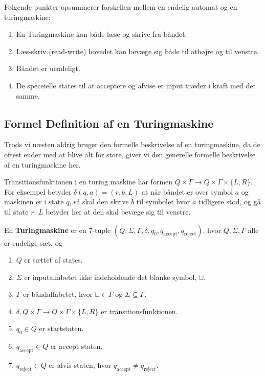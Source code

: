 Følgende punkter opsummerer forskellen mellem en endelig automat og en turingmaskine:

\begin{enumerate}
	\item En Turingmaskine kan både læse og skrive fra båndet.
	\item Læs-skriv (read-write) hovedet kan bevæge sig både til athøjre og til venstre.
	\item Båndet er uendeligt.
	\item De speceielle states til at acceptere og afvise et input træder i kraft med det samme.
\end{enumerate}



\subsection{Formel Definition af en Turingmaskine}%
\label{subsec:formaldefturingmachine}



Trods vi næsten aldrig bruger den formelle beskrivelse af en turingmaskine, da de oftest ender med at blive alt for store, giver vi den generelle formelle beskrivelse af en turingmaskine her.

Transitionsfunktionen i en turing maskine har formen $Q \times \Gamma \longrightarrow Q \times \Gamma \times \{L, R\}$. For eksempel betyder $\delta (q,a) = (r,b,L)$ at når båndet er over symbol $a$ og maskinen er i state $q$, så skal den skrive $b$ til symbolet hvor $a$ tidligere stod, og gå til state $r$. $L$ betyder her at den skal bevæge sig til venstre.

\begin{definition}
	\label{def:formalturing}
	En \textbf{Turingmaskine} er en 7-tuple $(Q, \Sigma, \Gamma, \delta, q_{0}, q_{\text{accept}}, q_{\text{reject}})$, hvor $Q, \Sigma, \Gamma$ alle er endelige sæt, og
	\begin{enumerate}
		\item $Q$ er sættet af states.
		\item $\Sigma$ er inputalfabetet ikke indeholdende det blanke symbol, $\sqcup$.
		\item $\Gamma$ er båndalfabetet, hvor $\sqcup \in \Gamma$ og $\Sigma \subseteq \Gamma$.
		\item $\delta, Q \times \Gamma \longrightarrow Q \times \Gamma \times \{L, R\}$ er transitionsfunktionen.
		\item $q_{0} \in Q$ er startstaten.
		\item $q_{\text{accept}} \in Q$ er accept staten.
		\item $q_{\text{reject}} \in Q$ er afvis staten, hvor $q_{\text{accept}} \neq q_{\text{reject}}$.
	\end{enumerate}
\end{definition}


